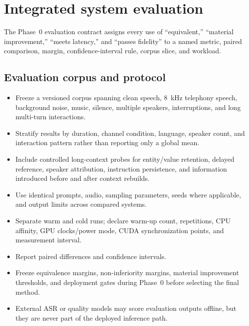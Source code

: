 \documentclass[10pt,letterpaper]{article}
\begin{document}
\section{Integrated system evaluation}

The Phase~0 evaluation contract assigns every use of ``equivalent,'' ``material
improvement,'' ``meets latency,'' and ``passes fidelity'' to a named metric,
paired comparison, margin, confidence-interval rule, corpus slice, and workload.

\subsection{Evaluation corpus and protocol}
\begin{itemize}
    \item Freeze a versioned corpus spanning clean speech, 8~kHz telephony speech, background noise, music, silence, multiple speakers, interruptions, and long multi-turn interactions.
    \item Stratify results by duration, channel condition, language, speaker count, and interaction pattern rather than reporting only a global mean.
    \item Include controlled long-context probes for entity/value retention, delayed reference, speaker attribution, instruction persistence, and information introduced before and after context rebuilds.
    \item Use identical prompts, audio, sampling parameters, seeds where applicable, and output limits across compared systems.
    \item Separate warm and cold runs; declare warm-up count, repetitions, CPU affinity, GPU clocks/power mode, CUDA synchronization points, and measurement interval.
    \item Report paired differences and confidence intervals.
    \item Freeze equivalence margins, non-inferiority margins, material improvement thresholds, and deployment gates during Phase~0 before selecting the final method.
    \item External ASR or quality models may score evaluation outputs offline, but they are never part of the deployed inference path.
\end{itemize}
\end{document}
